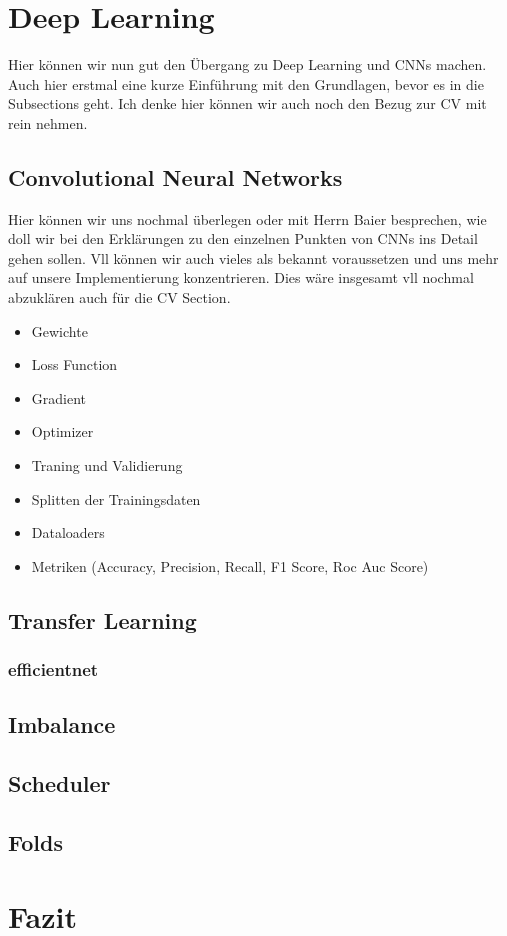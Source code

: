 \documentclass[12pt, a4paper]{article}
\begin{document}
\section{Deep Learning}
Hier können wir nun gut den Übergang zu Deep Learning und CNNs machen. Auch hier erstmal eine kurze Einführung mit den Grundlagen, bevor es in die Subsections geht. Ich denke hier können wir auch noch den Bezug zur CV mit rein nehmen.

\subsection{Convolutional Neural Networks}
Hier können wir uns nochmal überlegen oder mit Herrn Baier besprechen, wie doll wir bei den Erklärungen zu den einzelnen Punkten von CNNs ins Detail gehen sollen. Vll können wir auch vieles als bekannt voraussetzen und uns mehr auf unsere Implementierung konzentrieren. Dies wäre insgesamt vll nochmal abzuklären auch für die CV Section.

\begin{itemize}
	\item Gewichte
	\item Loss Function
	\item Gradient
	\item Optimizer
	\item Traning und Validierung
	\item Splitten der Trainingsdaten
	\item Dataloaders
	\item Metriken (Accuracy, Precision, Recall, F1 Score, Roc Auc Score)
\end{itemize}

\subsection{Transfer Learning}

\subsubsection{efficientnet}

\subsection{Imbalance}

\subsection{Scheduler}

\subsection{Folds}

\section{Fazit}
\end{document}
